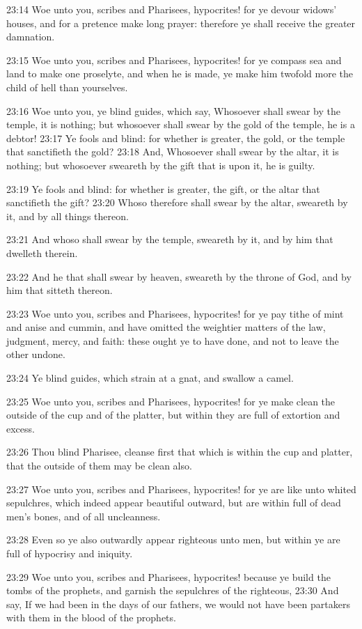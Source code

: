 23:14 Woe unto you, scribes and Pharisees, hypocrites! for ye devour
widows' houses, and for a pretence make long prayer: therefore ye
shall receive the greater damnation.

23:15 Woe unto you, scribes and Pharisees, hypocrites! for ye compass
sea and land to make one proselyte, and when he is made, ye make him
twofold more the child of hell than yourselves.

23:16 Woe unto you, ye blind guides, which say, Whosoever shall swear
by the temple, it is nothing; but whosoever shall swear by the gold of
the temple, he is a debtor!  23:17 Ye fools and blind: for whether is
greater, the gold, or the temple that sanctifieth the gold?  23:18
And, Whosoever shall swear by the altar, it is nothing; but whosoever
sweareth by the gift that is upon it, he is guilty.

23:19 Ye fools and blind: for whether is greater, the gift, or the
altar that sanctifieth the gift?  23:20 Whoso therefore shall swear by
the altar, sweareth by it, and by all things thereon.

23:21 And whoso shall swear by the temple, sweareth by it, and by him
that dwelleth therein.

23:22 And he that shall swear by heaven, sweareth by the throne of
God, and by him that sitteth thereon.

23:23 Woe unto you, scribes and Pharisees, hypocrites! for ye pay
tithe of mint and anise and cummin, and have omitted the weightier
matters of the law, judgment, mercy, and faith: these ought ye to have
done, and not to leave the other undone.

23:24 Ye blind guides, which strain at a gnat, and swallow a camel.

23:25 Woe unto you, scribes and Pharisees, hypocrites! for ye make
clean the outside of the cup and of the platter, but within they are
full of extortion and excess.

23:26 Thou blind Pharisee, cleanse first that which is within the cup
and platter, that the outside of them may be clean also.

23:27 Woe unto you, scribes and Pharisees, hypocrites! for ye are like
unto whited sepulchres, which indeed appear beautiful outward, but are
within full of dead men's bones, and of all uncleanness.

23:28 Even so ye also outwardly appear righteous unto men, but within
ye are full of hypocrisy and iniquity.

23:29 Woe unto you, scribes and Pharisees, hypocrites! because ye
build the tombs of the prophets, and garnish the sepulchres of the
righteous, 23:30 And say, If we had been in the days of our fathers,
we would not have been partakers with them in the blood of the
prophets.

